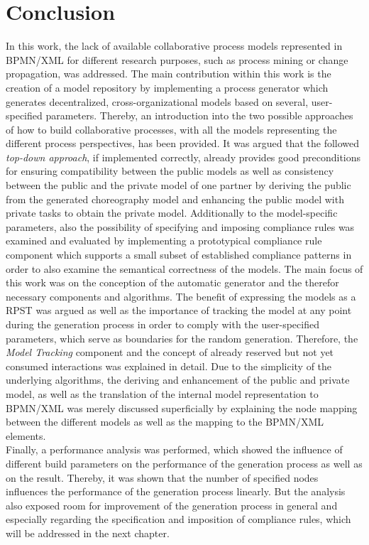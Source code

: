 \section{Conclusion}
In this work, the lack of available collaborative process models represented in BPMN/XML for different research purposes, such as process mining or change propagation, was addressed. The main contribution within this work is the creation of a model repository by implementing a process generator which generates decentralized, cross-organizational models based on several, user-specified parameters. Thereby, an introduction into the two possible approaches of how to build collaborative processes, with all the models representing the different process perspectives, has been provided. It was argued that the followed \textit{top-down approach}, if implemented correctly, already provides good preconditions for ensuring compatibility between the public models as well as consistency between the public and the private model of one partner by deriving the public from the generated choreography model and enhancing the public model with private tasks to obtain the private model. Additionally to the model-specific parameters, also the possibility of specifying and imposing compliance rules was examined and evaluated by implementing a prototypical compliance rule component which supports a small subset of established compliance patterns in order to also examine the semantical correctness of the models. The main focus of this work was on the conception of the automatic generator and the therefor necessary components and algorithms. The benefit of expressing the models as a RPST was argued as well as the importance of tracking the model at any point during the generation process in order to comply with the user-specified parameters, which serve as boundaries for the random generation. Therefore, the \textit{Model Tracking} component and the concept of already reserved but not yet consumed interactions was explained in detail. Due to the simplicity of the underlying algorithms, the deriving and enhancement of the public and private model, as well as the translation of the internal model representation to BPMN/XML was merely discussed superficially by explaining the node mapping between the different models as well as the mapping to the BPMN/XML elements.\\
Finally, a performance analysis was performed, which showed the influence of different build parameters on the performance of the generation process as well as on the result. Thereby, it was shown that the number of specified nodes influences the performance of the generation process linearly. But the analysis also exposed room for improvement of the generation process in general and especially regarding the specification and imposition of compliance rules, which will be addressed in the next chapter.


